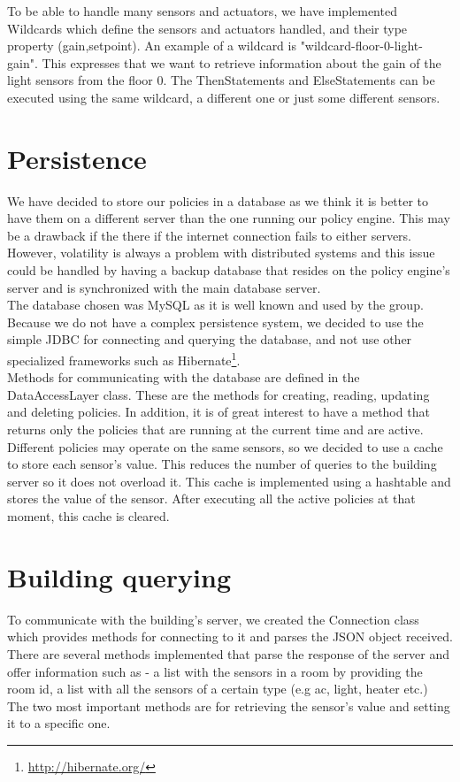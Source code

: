 To be able to handle many sensors and actuators, we have implemented Wildcards which define the sensors and actuators handled, and their type property (gain,setpoint). An example of a wildcard is "wildcard-floor-0-light-gain". This expresses that we want to retrieve information about the gain of the light sensors from the floor 0. The  ThenStatements and ElseStatements can be executed using the same wildcard, a different  one or just some different sensors. 
\section{Persistence}
We have decided to store our policies in a database as we think it is better to have them on a different server than the one running our policy engine. This may be a drawback if the there if the internet connection fails to either servers. However, volatility is always a problem with distributed systems and this issue could be handled by having a backup database that resides on the policy engine's server and is synchronized with the main database server.
\\ The database chosen was MySQL as it is well known and used by the group. Because we do not have a complex persistence system, we decided to use the simple JDBC for connecting and querying the database, and not use other specialized frameworks such as Hibernate\footnote{\url{http://hibernate.org/}}. 
\\Methods for communicating with the database are defined in the DataAccessLayer class. These are the methods for creating, reading, updating and deleting policies. In addition, it is of great interest to have a method that returns only the policies that are running at the current time and are active. 
\\Different policies may operate on the same sensors, so we decided to use a cache to store each sensor's value. This reduces the number of queries to the building server so it does not overload it. This cache is implemented using a hashtable and stores the value of the sensor. After executing all the active policies at that moment, this cache is cleared. 
\section{Building querying}
To communicate with the building's server, we created the Connection class which provides methods for connecting to it and parses the JSON object received. There are several methods implemented that parse the response of the server and offer information such as - a list with the sensors in a room by providing the room id, a list with all the sensors of a certain type (e.g ac, light, heater etc.) The two most important methods are for retrieving the sensor's value and setting it to a specific one. 

